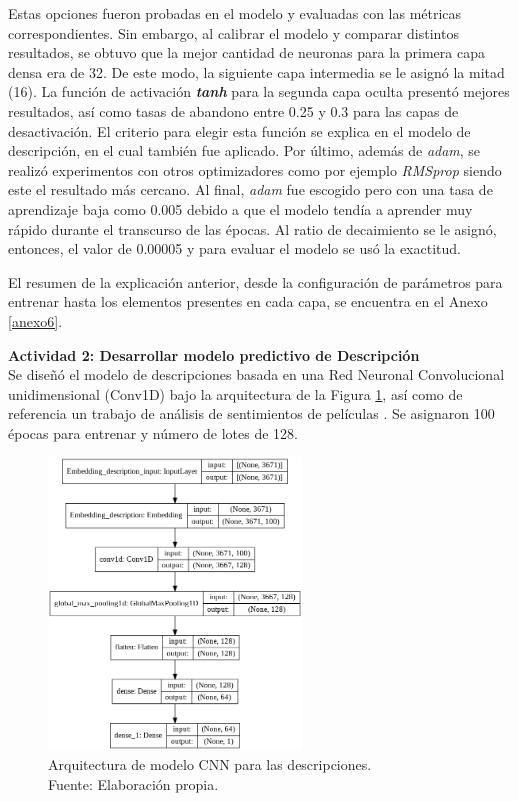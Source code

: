 Estas opciones fueron probadas en el modelo y evaluadas con las métricas correspondientes. Sin embargo, al calibrar el modelo y comparar distintos resultados, se obtuvo que la mejor cantidad de neuronas para la primera capa densa era de 32. De este modo, la siguiente capa intermedia se le asignó la mitad (16). La función de activación \textit{\textbf{tanh}} para la segunda capa oculta presentó mejores resultados, así como tasas de abandono entre 0.25 y 0.3 para las capas de desactivación. El criterio para elegir esta función se explica en el modelo de descripción, en el cual también fue aplicado. Por último, además de \textit{adam}, se realizó experimentos con otros optimizadores como por ejemplo \textit{RMSprop} siendo este el resultado más cercano. Al final, \textit{adam} fue escogido pero con una tasa de aprendizaje baja como 0.005 debido a que el modelo tendía a aprender muy rápido durante el transcurso de las épocas. Al ratio de decaimiento se le asignó, entonces, el valor de 0.00005 y para evaluar el modelo se usó la exactitud.

El resumen de la explicación anterior, desde la configuración de parámetros para entrenar hasta los elementos presentes en cada capa, se encuentra en el Anexo \ref{anexo6}.

\textbf{Actividad 2: Desarrollar modelo predictivo de Descripción}
\\
Se diseñó el modelo de descripciones basada en una Red Neuronal Convolucional unidimensional (Conv1D) bajo la arquitectura de la Figura \ref{4:fig35}, así como de referencia un trabajo de análisis de sentimientos de películas \parencite{tec_malik2019pythonnlp}. Se asignaron 100 épocas para entrenar y número de lotes de 128.

\begin{figure}[!ht]
	\begin{center}
		\includegraphics[width=0.60\textwidth]{4/figures/model_cnn_description.png}
		\caption[Arquitectura de modelo CNN para las descripciones]{Arquitectura de modelo CNN para las descripciones.\\
			Fuente: Elaboración propia.}
		\label{4:fig35}
	\end{center}
\end{figure}

